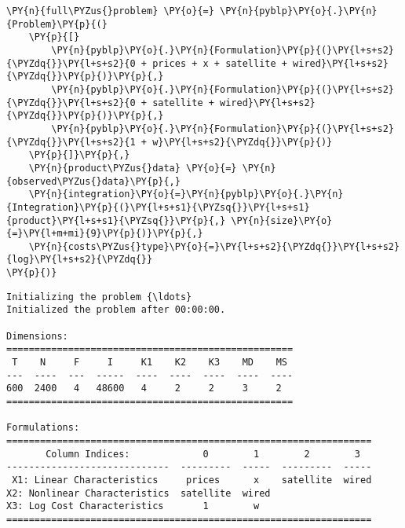     \begin{tcolorbox}[breakable, size=fbox, boxrule=1pt, pad at break*=1mm,colback=cellbackground, colframe=cellborder]
\begin{Verbatim}[commandchars=\\\{\}]
\PY{n}{full\PYZus{}problem} \PY{o}{=} \PY{n}{pyblp}\PY{o}{.}\PY{n}{Problem}\PY{p}{(}
    \PY{p}{[}
        \PY{n}{pyblp}\PY{o}{.}\PY{n}{Formulation}\PY{p}{(}\PY{l+s+s2}{\PYZdq{}}\PY{l+s+s2}{0 + prices + x + satellite + wired}\PY{l+s+s2}{\PYZdq{}}\PY{p}{)}\PY{p}{,}
        \PY{n}{pyblp}\PY{o}{.}\PY{n}{Formulation}\PY{p}{(}\PY{l+s+s2}{\PYZdq{}}\PY{l+s+s2}{0 + satellite + wired}\PY{l+s+s2}{\PYZdq{}}\PY{p}{)}\PY{p}{,}
        \PY{n}{pyblp}\PY{o}{.}\PY{n}{Formulation}\PY{p}{(}\PY{l+s+s2}{\PYZdq{}}\PY{l+s+s2}{1 + w}\PY{l+s+s2}{\PYZdq{}}\PY{p}{)}
    \PY{p}{]}\PY{p}{,}
    \PY{n}{product\PYZus{}data} \PY{o}{=} \PY{n}{observed\PYZus{}data}\PY{p}{,}
    \PY{n}{integration}\PY{o}{=}\PY{n}{pyblp}\PY{o}{.}\PY{n}{Integration}\PY{p}{(}\PY{l+s+s1}{\PYZsq{}}\PY{l+s+s1}{product}\PY{l+s+s1}{\PYZsq{}}\PY{p}{,} \PY{n}{size}\PY{o}{=}\PY{l+m+mi}{9}\PY{p}{)}\PY{p}{,}
    \PY{n}{costs\PYZus{}type}\PY{o}{=}\PY{l+s+s2}{\PYZdq{}}\PY{l+s+s2}{log}\PY{l+s+s2}{\PYZdq{}}
\PY{p}{)}
\end{Verbatim}
\end{tcolorbox}

    \begin{Verbatim}[commandchars=\\\{\}]
Initializing the problem {\ldots}
Initialized the problem after 00:00:00.

Dimensions:
===================================================
 T    N     F     I     K1    K2    K3    MD    MS
---  ----  ---  -----  ----  ----  ----  ----  ----
600  2400   4   48600   4     2     2     3     2
===================================================

Formulations:
=================================================================
       Column Indices:             0        1        2        3
-----------------------------  ---------  -----  ---------  -----
 X1: Linear Characteristics     prices      x    satellite  wired
X2: Nonlinear Characteristics  satellite  wired
X3: Log Cost Characteristics       1        w
=================================================================
    \end{Verbatim}

